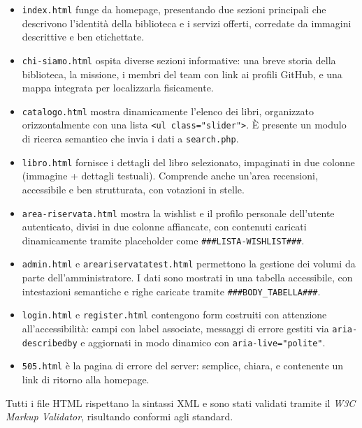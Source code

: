 \documentclass{article}
\begin{document}
\begin{itemize}
  \item \texttt{index.html} funge da homepage, presentando due sezioni principali che descrivono l’identità della biblioteca e i servizi offerti, corredate da immagini descrittive e ben etichettate.
  
  \item \texttt{chi-siamo.html} ospita diverse sezioni informative: una breve storia della biblioteca, la missione, i membri del team con link ai profili GitHub, e una mappa integrata per localizzarla fisicamente.

  \item \texttt{catalogo.html} mostra dinamicamente l’elenco dei libri, organizzato orizzontalmente con una lista \texttt{<ul class="slider">}. È presente un modulo di ricerca semantico che invia i dati a \texttt{search.php}.

  \item \texttt{libro.html} fornisce i dettagli del libro selezionato, impaginati in due colonne (immagine + dettagli testuali). Comprende anche un’area recensioni, accessibile e ben strutturata, con votazioni in stelle.

  \item \texttt{area-riservata.html} mostra la wishlist e il profilo personale dell’utente autenticato, divisi in due colonne affiancate, con contenuti caricati dinamicamente tramite placeholder come \texttt{\#\#\#LISTA-WISHLIST\#\#\#}.

  \item \texttt{admin.html} e \texttt{areariservatatest.html} permettono la gestione dei volumi da parte dell’amministratore. I dati sono mostrati in una tabella accessibile, con intestazioni semantiche e righe caricate tramite \texttt{\#\#\#BODY\_TABELLA\#\#\#}.

  \item \texttt{login.html} e \texttt{register.html} contengono form costruiti con attenzione all’accessibilità: campi con label associate, messaggi di errore gestiti via \texttt{aria-describedby} e aggiornati in modo dinamico con \texttt{aria-live="polite"}.

  \item \texttt{505.html} è la pagina di errore del server: semplice, chiara, e contenente un link di ritorno alla homepage.
\end{itemize}

Tutti i file HTML rispettano la sintassi XML e sono stati validati tramite il \textit{W3C Markup Validator}, risultando conformi agli standard.
\end{document}
